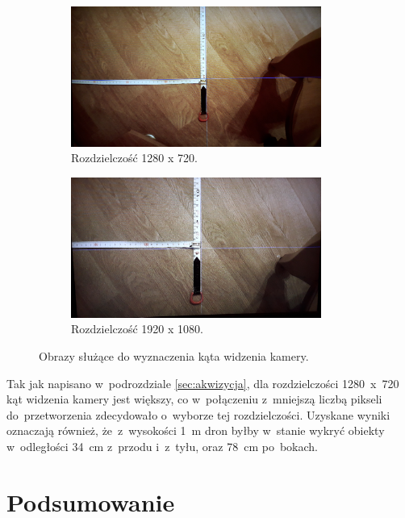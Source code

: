 \begin{figure}
	\centering
	\begin{subfigure}{0.7\textwidth}
		\centering
		\includegraphics[width=0.9\textwidth]{720p.jpg}
		\caption{Rozdzielczość 1280 x 720.}
		\label{fig:1080p}
	\end{subfigure}
	\begin{subfigure}{0.7\textwidth}
		\centering
		\includegraphics[width=0.9\textwidth]{1080p.jpg}
		\caption{Rozdzielczość 1920 x 1080.}
		\label{fig:720p}
	\end{subfigure}
	\caption{Obrazy służące do wyznaczenia kąta widzenia kamery.}
	\label{fig:rozdzielczosc}
\end{figure}
Tak jak napisano w~podrozdziale \ref{sec:akwizycja}, dla rozdzielczości 1280~x~720 kąt widzenia kamery jest większy, co w~połączeniu z~mniejszą liczbą pikseli do~przetworzenia zdecydowało o~wyborze tej rozdzielczości.
Uzyskane wyniki oznaczają również, że~z~wysokości 1~m dron byłby w~stanie wykryć obiekty w~odległości 34~cm z~przodu i~z~tyłu, oraz 78~cm po~bokach.

\section{Podsumowanie}

